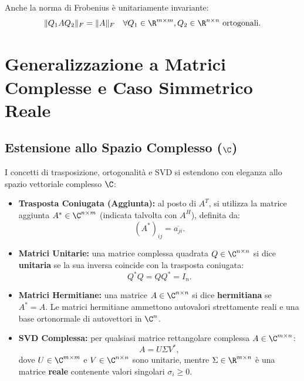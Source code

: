 \begin{corollary}
Anche la norma di Frobenius \`e unitariamente invariante:
\begin{equation}
    \|Q_1 A Q_2\|_F = \|A\|_F \quad \forall Q_1 \in \R^{m \times m}, Q_2 \in \R^{n \times n} \text{ ortogonali}.
\end{equation}
\end{corollary}

\FloatBarrier
\section{Generalizzazione a Matrici Complesse e Caso Simmetrico Reale}
\label{sec:matrici-complesse-simmetriche}

\subsection{Estensione allo Spazio Complesso ($\C$)}

I concetti di trasposizione, ortogonalit\`a e SVD si estendono con eleganza allo spazio vettoriale complesso $\C$:
\begin{itemize}
    \item \textbf{Trasposta Coniugata (Aggiunta):} al posto di $A^T$, si utilizza la matrice aggiunta $A^* \in \C^{n \times m}$ (indicata talvolta con $A^H$), definita da:
    \begin{equation}
        (A^*)_{ij} = \overline{a_{ji}}.
    \end{equation}
    \item \textbf{Matrici Unitarie:} una matrice complessa quadrata $Q \in \C^{n \times n}$ si dice \textbf{unitaria} se la sua inversa coincide con la trasposta coniugata:
    \begin{equation}
        Q^* Q = Q Q^* = I_n.
    \end{equation}
    \item \textbf{Matrici Hermitiane:} una matrice $A \in \C^{n \times n}$ si dice \textbf{hermitiana} se $A^* = A$. Le matrici hermitiane ammettono autovalori strettamente reali e una base ortonormale di autovettori in $\C^n$.
    \item \textbf{SVD Complessa:} per qualsiasi matrice rettangolare complessa $A \in \C^{m \times n}$:
    \begin{equation}
        A = U \Sigma V^*,
    \end{equation}
    dove $U \in \C^{m \times m}$ e $V \in \C^{n \times n}$ sono unitarie, mentre $\Sigma \in \R^{m \times n}$ \`e una matrice \textbf{reale} contenente valori singolari $\sigma_i \ge 0$.
\end{itemize}

